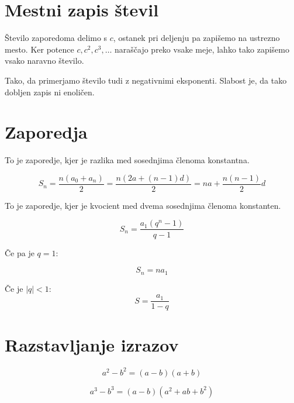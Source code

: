 \section{Mestni zapis števil}


Število zaporedoma delimo s $c$, ostanek pri deljenju pa zapišemo na ustrezno mesto. Ker potence $c, c^2, c^3, \ldots$ naraščajo preko vsake meje, lahko tako zapišemo vsako naravno število.


Tako, da primerjamo število tudi z negativnimi eksponenti. Slabost je, da tako dobljen zapis ni enoličen.

\section{Zaporedja}


To je zaporedje, kjer je razlika med sosednjima členoma konstantna.

\[
	S_n = \frac{n(a_0 + a_n)}{2} = \frac{n(2a + (n-1)d)}{2} = na + \frac{n(n-1)}{2}d
\]


To je zaporedje, kjer je kvocient med dvema sosednjima členoma konstanten.

\[
	S_n = \frac{a_1 (q^n - 1)}{q-1}
\]

Če pa je $q=1$:

\[
	S_n = na_1
\]


Če je $\left|q\right| < 1$:
\[
	S = \frac{a_1}{1-q}
\]

\section{Razstavljanje izrazov}


\[
	a^2-b^2 = (a-b)(a+b)
\]

\[
	a^3-b^3 = (a-b)(a^2 + ab + b^2)
\]

